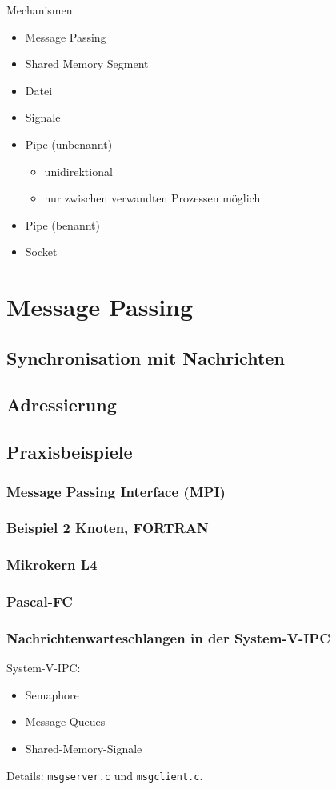 Mechanismen:
\begin{itemize}
\item Message Passing
\item Shared Memory Segment
\item Datei
\item Signale
\item Pipe (unbenannt)
\begin{itemize}
\item unidirektional
\item nur zwischen verwandten Prozessen möglich
\end{itemize}
\item Pipe (benannt)
\item Socket
\end{itemize}
\section{Message Passing}

\subsection{Synchronisation mit Nachrichten}
\subsection{Adressierung}
\subsection{Praxisbeispiele}
\subsubsection{Message Passing Interface (MPI)}
\subsubsection*{Beispiel 2 Knoten, FORTRAN}
\subsubsection{Mikrokern L4}
\subsubsection{Pascal-FC}
\subsubsection{Nachrichtenwarteschlangen in der System-V-IPC}
System-V-IPC:
\begin{itemize}
\item Semaphore
\item Message Queues
\item Shared-Memory-Signale
\end{itemize}
Details: \lstinline$msgserver.c$ und \lstinline$msgclient.c$.

